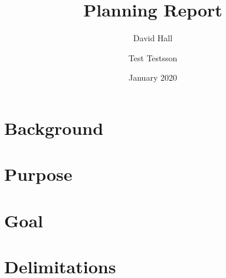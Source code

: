 \documentclass{article}
\title{Planning Report}
\author{David Hall \and Test Testsson}
\date{January 2020}
\begin{document}
\maketitle

\section{Background}
\section{Purpose}
\section{Goal}
\section{Delimitations}
\section{}
\end{document}
